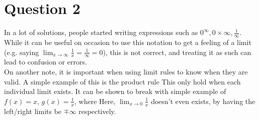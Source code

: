 \documentclass{article}
\begin{document}
\section{Question 2}
In a lot of solutions, people started writing expressions such as $0^\infty, 0 \times \infty, \frac{1}{\infty}$. While it can be useful on occasion to use this notation to get a feeling of a limit (e.g. saying $\lim_{x \to \infty} \frac{1}{x} = \frac{1}{\infty} = 0$), this is not correct, and treating it as such can lead to confusion or errors. \\
On another note, it is important when using limit rules to know when they are valid. A simple example of this is the product rule 
This only hold when each individual limit exists. It can be shown to break with simple example of $f(x) = x$, $g(x) = \frac{1}{x}$, where
Here, $\lim_{x \to 0} \frac{1}{x}$ doesn't even exists, by having the left/right limits be $\mp \infty$ respectively. 
\end{document}
